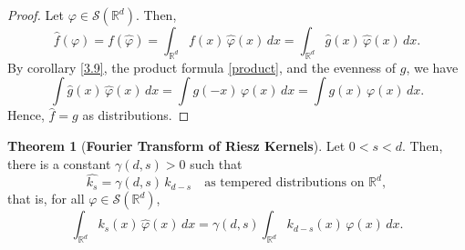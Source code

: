 \documentclass[12pt,a4paper]{report}
\theoremstyle{definition}
\newtheorem{theorem}{Theorem}
\begin{document}
\begin{proof}
Let \( \varphi \in \mathcal{S}(\mathbb{R}^d) \). Then,
\[
\widehat{f}(\varphi) = f(\widehat{\varphi}) = \int_{\mathbb{R}^d} f(x) \, \widehat{\varphi}(x) \, dx
= \int_{\mathbb{R}^d} \widehat{g}(x) \, \widehat{\varphi}(x) \, dx.
\]
By corollary \ref{3.9}, the product formula \ref{product}, and the evenness of $g$, we have
\[
\int \widehat{g}(x) \, \widehat{\varphi}(x) \, dx
= \int g(-x) \, \varphi(x) \, dx
= \int g(x) \, \varphi(x) \, dx.
\]
Hence, \( \widehat{f} = g \) as distributions.
\end{proof}

\begin{theorem}[\textbf{Fourier Transform of Riesz Kernels}] \label{thm:RieszFourier}
Let \( 0 < s < d \). Then, there is a constant \( \gamma(d,s) > 0 \) such that
\[
\widehat{k_s} = \gamma(d,s) \, k_{d-s}
\quad \text{as tempered distributions on } \mathbb{R}^d,
\]
that is, for all \( \varphi \in \mathcal{S}(\mathbb{R}^d) \),
\begin{equation}
\int_{\mathbb{R}^d} k_s(x) \, \widehat{\varphi}(x) \, dx
= \gamma(d,s) \int_{\mathbb{R}^d} k_{d-s}(x) \, \varphi(x) \, dx.
\label{eq:RieszFourier}
\end{equation}
\end{theorem}
\end{document}
